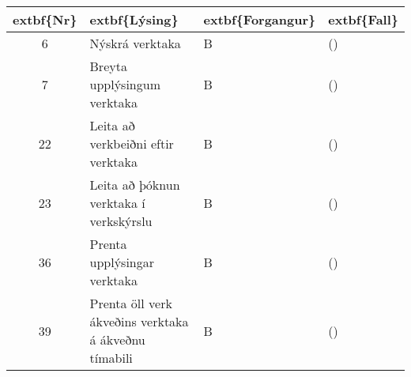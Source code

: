 \documentclass[a4paper]{article}
\begin{document}
\begin{tabular}{|c|p{10cm}|l|l|}
\hline
	extbf\{Nr\}&	extbf\{Lýsing\}&	extbf\{Forgangur\}&	extbf\{Fall\}\\
\hline
6&Nýskrá verktaka&B &()\\
\hline
7&Breyta upplýsingum verktaka&B &()\\
\hline
22&Leita að verkbeiðni eftir verktaka&B &()\\
\hline
23&Leita að þóknun verktaka í verkskýrslu&B &()\\
\hline
36&Prenta upplýsingar verktaka&B &()\\
\hline
39&Prenta öll verk ákveðins verktaka á ákveðnu tímabili&B &()\\
\hline
\end{tabular}
\end{document}
